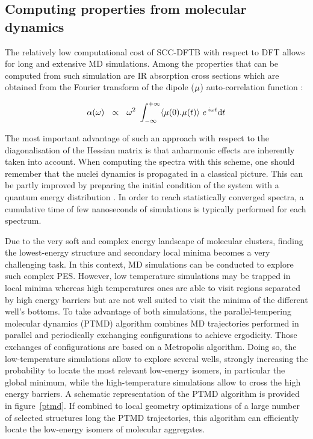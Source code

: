 \documentclass[]{interact}
\theoremstyle{plain}%
\theoremstyle{definition}
\theoremstyle{remark}
\begin{document}
\subsection{Computing properties from molecular dynamics }

The relatively low computational cost of SCC-DFTB with respect to DFT allows for  long and extensive MD simulations.
Among the properties that can be computed from such simulation are IR absorption cross sections which are obtained from 
the Fourier transform of the dipole (${\bf \mu}$) auto-correlation function \cite{Spirko99,gai03,joalland2010,simon2011}:

\begin{equation} 
\label{Eq:specdyn} 
\alpha(\omega)\ \ \propto\ \ \omega^2\
\int_{-\infty}^{+\infty} \langle{\bf  \mu}(0).{\bf \mu}(t)\rangle\
e\,^{i\omega t} \textrm{d}t 
\end{equation}

The most important advantage of such an approach with respect to the diagonalisation of the Hessian matrix is that anharmonic effects
are inherently taken into account. When computing the spectra with this scheme, one should remember that the nuclei dynamics is propagated in a classical picture. This can be partly improved by preparing the initial condition of the  system with a quantum energy distribution \cite{adswi}.
In order to reach statistically converged spectra, a cumulative time of few nanoseconds of simulations is typically performed for each spectrum. 

Due to the very soft and complex energy landscape of molecular clusters, finding the lowest-energy structure and secondary local minima
becomes a very challenging task. In this context, MD simulations can be conducted to explore such complex PES. However, low temperature
simulations may be trapped in local minima whereas high temperatures ones are able to visit regions separated by high energy barriers but
are not well suited to visit the minima of the different well's bottoms. To take advantage of both simulations, the parallel-tempering molecular
dynamics (PTMD) \cite{Sugita1999,Sugita2000} algorithm combines MD trajectories performed in parallel and periodically exchanging configurations
to achieve ergodicity. Those exchanges of configurations are based on a Metropolis algorithm. Doing so, the low-temperature simulations allow
to explore several wells, strongly increasing the probability to locate the most relevant low-energy isomers, in particular the global minimum,
while the high-temperature simulations allow to cross the high energy barriers. A schematic representation of the PTMD algorithm is provided in figure~\ref{ptmd}. If combined to local geometry optimizations of a large number of selected structures long the PTMD trajectories, this algorithm
can efficiently locate the low-energy isomers of molecular aggregates.
\end{document}
